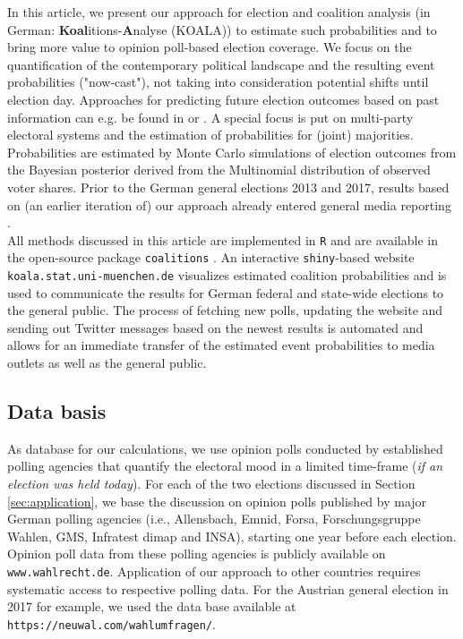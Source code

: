 \documentclass[smallcondensed]{svjour3}     %
\begin{document}
In this article, we present our approach for election and coalition analysis
(in German: \textbf{Koal}itions-\textbf{A}nalyse (KOALA)) to estimate such
probabilities and to bring more value to opinion poll-based election coverage.
We focus on the quantification of the contemporary political landscape and the
resulting event probabilities ("now-cast"), not taking into consideration
potential shifts until election day. Approaches for predicting future election
outcomes based on past information can e.g. be found in \citet{graefe_2017} or
\citet{norpoth_gschwend_2010}. A special focus is put on multi-party electoral
systems and the estimation of probabilities for (joint) majorities. Probabilities
are estimated by Monte Carlo simulations of election outcomes from the
Bayesian posterior derived from the Multinomial distribution of observed voter shares.
Prior to the German general elections 2013 and 2017, results based on
(an earlier iteration of) our approach already entered general media reporting
\citep[cf.][]{wahlistik_2013, gelitz_2017}.\\

All methods discussed in this article are implemented in \texttt{R} \citep{r_2017} and
are available in the open-source package \texttt{coalitions} \citep{bender_bauer_2018}.
An interactive \texttt{shiny}-based \citep{chang_2017} website
\texttt{koala.stat.uni-\allowbreak muenchen.\allowbreak de} visualizes estimated
coalition probabilities and is used to communicate the results for German federal
and state-wide elections to the general public. The process of fetching new polls,
updating the website and sending out Twitter messages based on the newest results
is automated and allows for an immediate transfer of the estimated event
probabilities to media outlets as well as the general public.

\subsection{Data basis}\label{ssec:data-basis}
As database for our calculations, we use opinion polls conducted by established
polling agencies that quantify the electoral mood in a limited time-frame
(\textit{if an election was held today}). For each of the two elections discussed
in Section \ref{sec:application}, we base the discussion on opinion polls published
by major German polling agencies (i.e., Allensbach, Emnid, Forsa, Forschungsgruppe Wahlen,
GMS, Infratest dimap and INSA), starting one year before each election.
Opinion poll data from these polling agencies is publicly available
on \texttt{www.wahlrecht.de}. Application of our approach to other countries
requires systematic access to respective polling data. For the Austrian general
election in 2017 for example, we used the data base available at
\texttt{https://neuwal.com/wahlumfragen/}.
\end{document}
